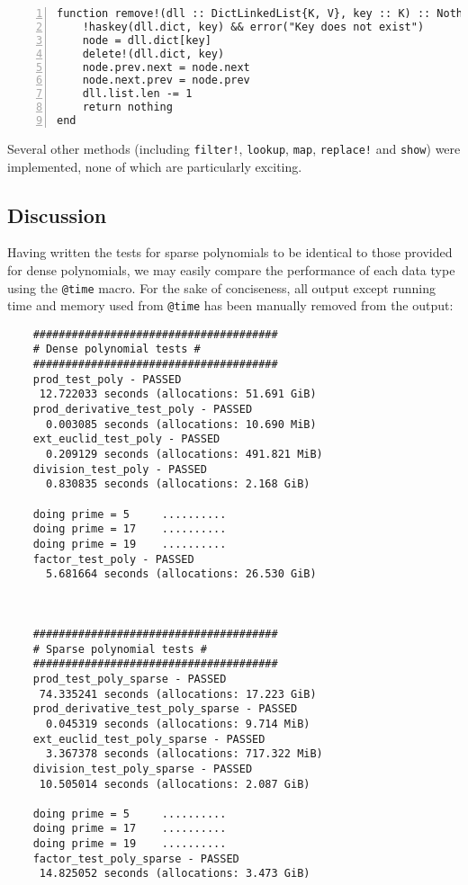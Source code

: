 \documentclass{article}
\theoremstyle{plain}
\numberwithin{theorem}{section}
\numberwithin{example}{section}
\theoremstyle{definition}
\numberwithin{definition}{section}
\begin{document}
\begin{codebox}
    \begin{Verbatim}[numbers=left,xleftmargin=5mm]
function remove!(dll :: DictLinkedList{K, V}, key :: K) :: Nothing where {K, V}
    !haskey(dll.dict, key) && error("Key does not exist")
    node = dll.dict[key]
    delete!(dll.dict, key)
    node.prev.next = node.next
    node.next.prev = node.prev
    dll.list.len -= 1
    return nothing
end
    \end{Verbatim}
\end{codebox}

Several other methods (including \texttt{filter!}, \texttt{lookup},
\texttt{map}, \texttt{replace!} and \texttt{show}) were implemented, none of
which are particularly exciting.

\bigbreak

\subsection{Discussion}

Having written the tests for sparse polynomials to be identical to those
provided for dense polynomials, we may easily compare the performance of each
data type using the \texttt{@time} macro. For the sake of conciseness, all
output except running time and memory used from \texttt{@time} has been manually
removed from the output:

\begin{Verbatim}
    ######################################
    # Dense polynomial tests #
    ######################################
    prod_test_poly - PASSED
     12.722033 seconds (allocations: 51.691 GiB)
    prod_derivative_test_poly - PASSED
      0.003085 seconds (allocations: 10.690 MiB)
    ext_euclid_test_poly - PASSED
      0.209129 seconds (allocations: 491.821 MiB)
    division_test_poly - PASSED
      0.830835 seconds (allocations: 2.168 GiB)

    doing prime = 5 	..........
    doing prime = 17 	..........
    doing prime = 19 	..........
    factor_test_poly - PASSED
      5.681664 seconds (allocations: 26.530 GiB)



    ######################################
    # Sparse polynomial tests #
    ######################################
    prod_test_poly_sparse - PASSED
     74.335241 seconds (allocations: 17.223 GiB)
    prod_derivative_test_poly_sparse - PASSED
      0.045319 seconds (allocations: 9.714 MiB)
    ext_euclid_test_poly_sparse - PASSED
      3.367378 seconds (allocations: 717.322 MiB)
    division_test_poly_sparse - PASSED
     10.505014 seconds (allocations: 2.087 GiB)

    doing prime = 5 	..........
    doing prime = 17 	..........
    doing prime = 19 	..........
    factor_test_poly_sparse - PASSED
     14.825052 seconds (allocations: 3.473 GiB)
\end{Verbatim}
\end{document}
